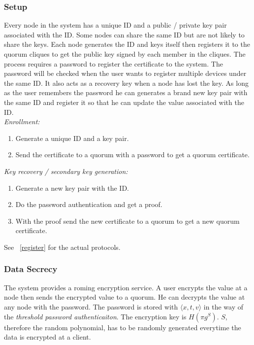 \documentclass[twoside,twocolumn,10pt,fleqn]{article}
\begin{document}
\subsubsection*{Setup}
Every node in the system has a unique ID and a public / private key
pair associated with the ID. Some nodes can share the same ID but are
not likely to share the keys. Each node generates the ID and keys
itself then registers it to the quorum cliques to get the public key
signed by each member in the cliques. The process requires a password
to register the certificate to the system. The password will be checked
when the user wants to register multiple devices under the
same ID. It also acts as a recovery key when a node has lost the
key. As long as the user remembers the password he can generates a
brand new key pair with the same ID and register it so that he can
update the value associated with the ID.\\

\noindent
{\em Enrollment:}
\begin{enumerate}
\item Generate a unique ID and a key pair.
\item Send the certificate to a quorum with a password to get a
  quorum certificate.
\end{enumerate}

\noindent
{\em Key recovery / secondary key generation:}
\begin{enumerate}
\item Generate a new key pair with the ID.
\item Do the password authentication and get a proof.
\item With the proof send the new certificate to a quorum to get a new
  quorum certificate.
\end{enumerate}
See ~\ref{register} for the actual protocols.

\subsubsection*{Data Secrecy}
The system provides a roming encryption service. A user encrypts
the value at a node then sends the encrypted value to a quorum. He can
decrypts the value at any node with the password. The password is
stored with $\langle x, t, v \rangle$ in the way of the {\em threshold
password authenticaiton}. The encryption key is $H(\pi g^S)$. $S$,
therefore the random polynomial, has to be randomly generated
everytime the data is encrypted at a client.
\end{document}
